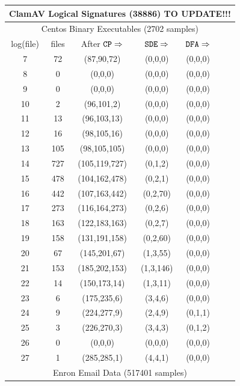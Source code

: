 \begin{figure}
\begin{footnotesize}
\begin{center}
\begin{tabular}{c c c c c c c}
\hline
\multicolumn{7}{c}{\bf ClamAV Logical Signatures (38886) TO UPDATE!!!} \\
\hline
\multicolumn{7}{c}{Centos Binary Executables (2702 samples)} \\
\hline
log(file) & files & After $\texttt{CP} \Rightarrow$ &  $\texttt{SDE} \Rightarrow$ & 
	$\texttt{DFA} \Rightarrow$  \\
\hline
\hline
7 &   72     & (87,90,72)  & (0,0,0) & (0,0,0) \\
8 &   0  & (0,0,0) & (0,0,0) & (0,0,0) \\
9 &   0  & (0,0,0) & (0,0,0) & (0,0,0) \\
10&   2  & (96,101,2)  & (0,0,0) & (0,0,0) \\
11&   13     & (96,103,13) & (0,0,0) & (0,0,0) \\
12&   16     & (98,105,16) & (0,0,0) & (0,0,0) \\
13&   105    & (98,105,105)    & (0,0,0) & (0,0,0) \\
14&   727    & (105,119,727)   & (0,1,2) & (0,0,0) \\
15&   478    & (104,162,478)   & (0,2,1) & (0,0,0) \\
16&   442    & (107,163,442)   & (0,2,70)    & (0,0,0) \\
17&   273    & (116,164,273)   & (0,2,6) & (0,0,0) \\
18&   163    & (122,183,163)   & (0,2,7) & (0,0,0) \\
19&   158    & (131,191,158)   & (0,2,60)    & (0,0,0) \\
20&   67     & (145,201,67)    & (1,3,55)    & (0,0,0) \\
21&   153    & (185,202,153)   & (1,3,146)   & (0,0,0) \\
22&   14     & (150,173,14)    & (1,3,11)    & (0,0,0) \\
23&   6  & (175,235,6) & (3,4,6) & (0,0,0) \\
24&   9  & (224,277,9) & (2,4,9) & (0,1,1) \\
25 &  3  & (226,270,3) & (3,4,3) & (0,1,2) \\
26 &  0  & (0,0,0) & (0,0,0) & (0,0,0) \\
27 &  1  & (285,285,1) & (4,4,1) & (0,0,0) \\
\multicolumn{7}{c}{Enron Email Data (517401 samples)} \\

\end{tabular}
\end{center}
\end{footnotesize}
\end{figure}
